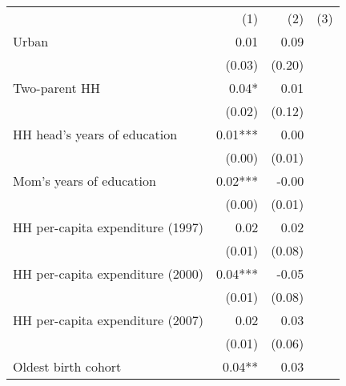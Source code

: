\begin{tabular}{llll}
\cline{1-4}
\multicolumn{1}{c}{} &
  \multicolumn{1}{r}{(1)} &
  \multicolumn{1}{r}{(2)} &
  \multicolumn{1}{r}{(3)} \\
\cline{1-4}
\multicolumn{1}{l}{Urban} &
  \multicolumn{1}{r}{0.01 } &
  \multicolumn{1}{r}{0.09 } &
  \multicolumn{1}{r}{} \\
\multicolumn{1}{l}{} &
  \multicolumn{1}{r}{(0.03)} &
  \multicolumn{1}{r}{(0.20)} &
  \multicolumn{1}{r}{} \\
\multicolumn{1}{l}{Two-parent HH} &
  \multicolumn{1}{r}{0.04* } &
  \multicolumn{1}{r}{0.01 } &
  \multicolumn{1}{r}{} \\
\multicolumn{1}{l}{} &
  \multicolumn{1}{r}{(0.02)} &
  \multicolumn{1}{r}{(0.12)} &
  \multicolumn{1}{r}{} \\
\multicolumn{1}{l}{HH head's years of education} &
  \multicolumn{1}{r}{0.01***} &
  \multicolumn{1}{r}{0.00 } &
  \multicolumn{1}{r}{} \\
\multicolumn{1}{l}{} &
  \multicolumn{1}{r}{(0.00)} &
  \multicolumn{1}{r}{(0.01)} &
  \multicolumn{1}{r}{} \\
\multicolumn{1}{l}{Mom's years of education} &
  \multicolumn{1}{r}{0.02***} &
  \multicolumn{1}{r}{-0.00 } &
  \multicolumn{1}{r}{} \\
\multicolumn{1}{l}{} &
  \multicolumn{1}{r}{(0.00)} &
  \multicolumn{1}{r}{(0.01)} &
  \multicolumn{1}{r}{} \\
\multicolumn{1}{l}{HH per-capita expenditure (1997)} &
  \multicolumn{1}{r}{0.02 } &
  \multicolumn{1}{r}{0.02 } &
  \multicolumn{1}{r}{} \\
\multicolumn{1}{l}{} &
  \multicolumn{1}{r}{(0.01)} &
  \multicolumn{1}{r}{(0.08)} &
  \multicolumn{1}{r}{} \\
\multicolumn{1}{l}{HH per-capita expenditure (2000)} &
  \multicolumn{1}{r}{0.04***} &
  \multicolumn{1}{r}{-0.05 } &
  \multicolumn{1}{r}{} \\
\multicolumn{1}{l}{} &
  \multicolumn{1}{r}{(0.01)} &
  \multicolumn{1}{r}{(0.08)} &
  \multicolumn{1}{r}{} \\
\multicolumn{1}{l}{HH per-capita expenditure (2007)} &
  \multicolumn{1}{r}{0.02 } &
  \multicolumn{1}{r}{0.03 } &
  \multicolumn{1}{r}{} \\
\multicolumn{1}{l}{} &
  \multicolumn{1}{r}{(0.01)} &
  \multicolumn{1}{r}{(0.06)} &
  \multicolumn{1}{r}{} \\
\multicolumn{1}{l}{Oldest birth cohort} &
  \multicolumn{1}{r}{0.04** } &
  \multicolumn{1}{r}{0.03 } &

\end{tabular}
